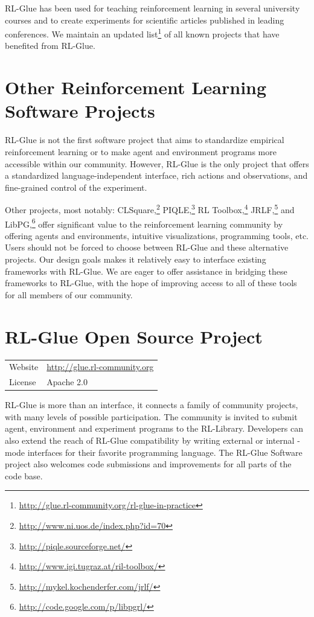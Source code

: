 \documentclass[twoside,11pt]{article}
\begin{document}
RL-Glue has been used for teaching reinforcement learning in several university courses and to create experiments for scientific articles published in leading conferences. We maintain an updated list\footnote{\url{http://glue.rl-community.org/rl-glue-in-practice}} of all known projects that have benefited from RL-Glue.



\section{Other Reinforcement Learning Software Projects}
RL-Glue is not the first software project that aims to  standardize empirical reinforcement learning or to make agent and environment programs more accessible within our community.  However, RL-Glue is the only project that offers a standardized language-independent interface, rich actions and observations, and fine-grained control of the experiment.

Other projects, most notably: CLSquare,\footnote{\url{http://www.ni.uos.de/index.php?id=70}}  PIQLE,\footnote{\url{http://piqle.sourceforge.net/}} RL Toolbox,\footnote{\url{http://www.igi.tugraz.at/ril-toolbox/}
} JRLF,\footnote{\url{http://mykel.kochenderfer.com/jrlf/}}  and LibPG,\footnote{\url{http://code.google.com/p/libpgrl/}} offer significant value to the reinforcement learning community by offering agents and environments, intuitive visualizations, programming tools, etc.  Users should not be forced to choose between RL-Glue and these alternative projects. Our design goals makes it relatively easy to interface existing frameworks with RL-Glue.  We are eager to offer assistance in bridging these frameworks to RL-Glue, with the hope of improving access to all of these tools for all members of our community.





 
 
 
\section{RL-Glue Open Source Project}
\begin{tabular}{ l l }
  Website &  \url{http://glue.rl-community.org} \\
  License & Apache 2.0  \\
\end{tabular}
\newline
\newline
RL-Glue is more than an interface, it connects a family of community projects, with many levels of possible participation. The community is invited to submit agent, environment and experiment programs to the RL-Library. Developers can also extend the reach of RL-Glue compatibility by writing external or internal -mode interfaces for their favorite programming language.  The RL-Glue Software project also welcomes code submissions and improvements for all parts of the code base.  
\end{document}

